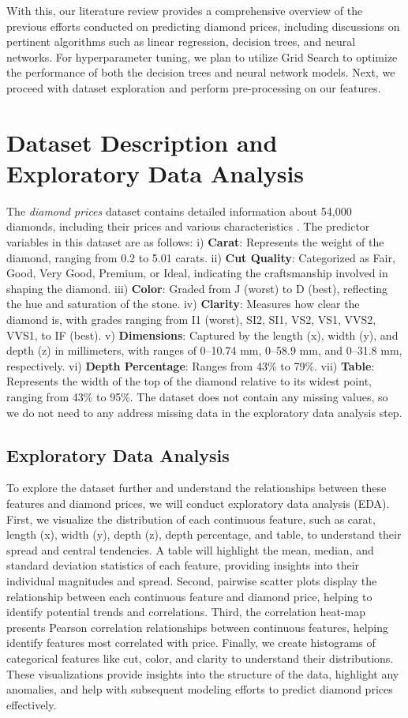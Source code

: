 \documentclass[conference]{IEEEtran}
\begin{document}
With this, our literature review provides a comprehensive overview of the previous efforts conducted on predicting diamond prices, including discussions on pertinent algorithms such as linear regression, decision trees, and neural networks. For hyperparameter tuning, we plan to utilize Grid Search to optimize the performance of both the decision trees and neural network models. Next, we proceed with dataset exploration and perform pre-processing on our features.

\section{Dataset Description and Exploratory Data Analysis}

The \emph{diamond prices} dataset contains detailed information about 54,000 diamonds, including their prices and various characteristics \cite{kaggle}. The predictor variables in this dataset are as follows: i) \textbf{Carat}: Represents the weight of the diamond, ranging from 0.2 to 5.01 carats. ii) \textbf{Cut Quality}: Categorized as Fair, Good, Very Good, Premium, or Ideal, indicating the craftsmanship involved in shaping the diamond. iii) \textbf{Color}: Graded from J (worst) to D (best), reflecting the hue and saturation of the stone. iv) \textbf{Clarity}: Measures how clear the diamond is, with grades ranging from I1 (worst), SI2, SI1, VS2, VS1, VVS2, VVS1, to IF (best). v) \textbf{Dimensions}: Captured by the length (x), width (y), and depth (z) in millimeters, with ranges of 0–10.74 mm, 0–58.9 mm, and 0–31.8 mm, respectively. vi) \textbf{Depth Percentage}: Ranges from 43\% to 79\%. vii) \textbf{Table}: Represents the width of the top of the diamond relative to its widest point, ranging from 43\% to 95\%. The dataset does not contain any missing values, so we do not need to any address missing data in the exploratory data analysis step.

\subsection{Exploratory Data Analysis}

To explore the dataset further and understand the relationships between these features and diamond prices, we will conduct exploratory data analysis (EDA). First, we visualize the distribution of each continuous feature, such as carat, length (x), width (y), depth (z), depth percentage, and table, to understand their spread and central tendencies. A table will highlight the mean, median, and standard deviation statistics of each feature, providing insights into their individual magnitudes and spread. Second, pairwise scatter plots display the relationship between each continuous feature and diamond price, helping to identify potential trends and correlations. Third, the correlation heat-map presents Pearson correlation relationships between continuous features, helping identify features most correlated with price. Finally, we create histograms of categorical features like cut, color, and clarity to understand their distributions. These visualizations provide insights into the structure of the data, highlight any anomalies, and help with subsequent modeling efforts to predict diamond prices effectively.
\end{document}

